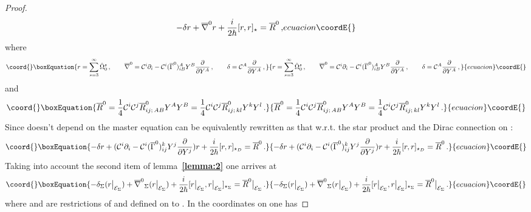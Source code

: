 \documentclass[a4paper,11pt]{amsart}
\numberwithin{thm}{section} %
\numberwithin{equation}{section} %
\numberwithin{figure}{section} %
\providecommand{\bref}[1]{{\bf \ref{#1}}}
\providecommand{\commut}[2]{[#1,#2]}
\renewcommand{\:}{{\rm\, :\,}}
\def\bar{\overline}
\def\d{\partial}
\providecommand{\dl}[1]{\displaystyle\frac{{\d}}{\d #1}}
\def\cP{{\mathcal P}}
\def\cc{{\mathcal C}}
\def\manM{{\mathcal M}}
\def\E{{ \mathcal E}}
\def\con{{\bar\Gamma}}
\def\Dcon-d{{\bar\nabla}^0}
\begin{document}
\begin{proof}
\begin{equation}
{}{
-\delta r + \Dcon-d r+\frac{i}{2\hbar}\commut{r}{r}_\star={\bar R}^0\,,
}{ecuacion}\coordE{}\end{equation}
where
\begin{equation}\coord{}\boxEquation{
r=\sum_{s=3}^\infty {\hat\Omega}^s_0\,, \qquad 
\Dcon-d =\cc^i\d_i-\cc^i (\con^0)^A_{iB}Y^B\dl{Y^A}\,, \qquad
\delta=\cc^A\dl{Y^A}\,,
}{
r=\sum_{s=3}^\infty {\hat\Omega}^s_0\,, \qquad 
\Dcon-d =\cc^i\d_i-\cc^i (\con^0)^A_{iB}Y^B\dl{Y^A}\,, \qquad
\delta=\cc^A\dl{Y^A}\,,
}{ecuacion}\coordE{}\end{equation}
and
\begin{equation}\coord{}\boxEquation{
  {\bar R}^0=
\frac{1}{4} \cc^i \cc^j  {\bar R}^0_{ij;\, A B} Y^A Y^B=
\frac{1}{4} \cc^i \cc^j  {\bar R}^0_{ij;\, kl} Y^k Y^l \,.
}{
  {\bar R}^0=
\frac{1}{4} \cc^i \cc^j  {\bar R}^0_{ij;\, A B} Y^A Y^B=
\frac{1}{4} \cc^i \cc^j  {\bar R}^0_{ij;\, kl} Y^k Y^l \,.
}{ecuacion}\coordE{}\end{equation}
Since \coordHE{} doesn't depend on \coordHE{} the master equation can be
equivalently rewritten as that w.r.t. the star product \coordHE{}
and the Dirac connection on \myHighlight{$\manM$}\coordHE{}:
\begin{equation}\coord{}\boxEquation{
-\delta r+(\cc^i\d_i-
\cc^i (\con^0)^k_{ij}Y^j\dl{Y^j})r+
\frac{i}{2\hbar}\commut{r}{r}_{\star_D}={\bar R}^0\,.
}{
-\delta r+(\cc^i\d_i-
\cc^i (\con^0)^k_{ij}Y^j\dl{Y^j})r+
\frac{i}{2\hbar}\commut{r}{r}_{\star_D}={\bar R}^0\,.
}{ecuacion}\coordE{}\end{equation}
Taking into account the second item of lemma~\bref{lemma:2}
one arrives at
\begin{equation}\coord{}\boxEquation{
\label{eq:F-master-sigma}
-\delta_{\Sigma}(r{\bigr|}_{\E_\Sigma})
+{\Dcon-d}_{\Sigma}(r{\bigr|}_{\E_\Sigma})
+\frac{i}{2\hbar}\commut{r{\bigr|}_{\E_\Sigma}}{r{\bigr|}_{\E_\Sigma}}_{\star_{\Sigma}}
={\bar R}^0{\bigr|}_{\E_\Sigma}\,.
}{
-\delta_{\Sigma}(r{\bigr|}_{\E_\Sigma})
+{\Dcon-d}_{\Sigma}(r{\bigr|}_{\E_\Sigma})
+\frac{i}{2\hbar}\commut{r{\bigr|}_{\E_\Sigma}}{r{\bigr|}_{\E_\Sigma}}_{\star_{\Sigma}}
={\bar R}^0{\bigr|}_{\E_\Sigma}\,.
}{ecuacion}\coordE{}\end{equation}
where \myHighlight{$\Dcon-d_{\Sigma}$}\coordHE{} and \myHighlight{$\delta_{\Sigma}$}\coordHE{} are restrictions
of \myHighlight{$\Dcon-d$}\coordHE{} and \myHighlight{$\delta$}\coordHE{} defined on \myHighlight{$\E$}\coordHE{} to \myHighlight{${\E_\Sigma}$}\coordHE{}. In the
coordinates \myHighlight{$x^a,p_a,Y^a,\cc^a,\cP_a$}\coordHE{} on \myHighlight{$\E_{\Sigma}$}\coordHE{} one has

\end{proof}
\end{document}
